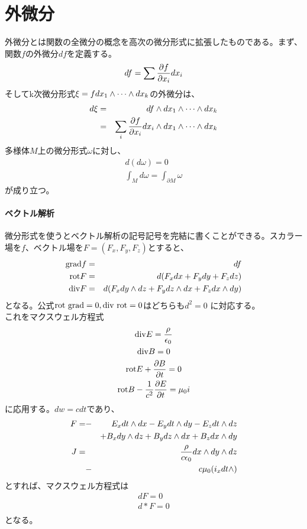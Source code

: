 \documentclass{jsarticle}
\begin{document}
    \section{外微分}
        外微分とは関数の全微分の概念を高次の微分形式に拡張したものである。まず、
        関数$f$の外微分$df$を定義する。
            \[df = \sum \pd[f]{x_i}dx_i\]
        そしてk次微分形式$\xi = fdx_1\we\cdots\we dx_k$の外微分は、
        \begin{eqnarray*}
            d\xi &=& df\we dx_1\we\cdots\we dx_k\\
            &=& \sum_i \pd[f]{x_i}dx_i\we dx_1\we\cdots\we dx_k\\
        \end{eqnarray*}
        多様体$M$上の微分形式$\omega$に対し、
        \begin{align*}
            d(d\omega) = 0\\
            \int_M d\omega = \int_{\partial M} \omega \tag{ストークスの定理}
        \end{align*}
        が成り立つ。
        \paragraph{ベクトル解析}
            微分形式を使うとベクトル解析の記号記号を完結に書くことができる。スカラー
            場を$f$、ベクトル場を$F = (F_x,F_y,F_z)$とすると、
            \begin{eqnarray*}
                {\rm grad}f &=& df\\
                {\rm rot}F &=& d(F_xdx+F_ydy+F_zdz)\\
                {\rm div}F &=& d(F_xdy\we dz+F_ydz\we dx+F_zdx\we dy)
            \end{eqnarray*}
            となる。公式${\rm rot\ grad}=0,{\rm div\ rot}=0$はどちらも$d^2=0$
            に対応する。\\
            これをマクスウェル方程式
            \begin{gather*}
                {\rm div}E = \frac{\rho}{\epsilon_0}\\
                {\rm div}B = 0\\
                {\rm rot}E+\pd[B]{t} = 0\\
                {\rm rot}B-\rec{c^2}\pd[E]{t} = \mu_0 i
            \end{gather*}
            に応用する。$dw = cdt$であり、
            \begin{eqnarray*}
                F = &-&E_xdt\we dx-E_ydt\we dy-E_zdt\we dz\\
                    & &+B_xdy\we dz+B_ydz\we dx+B_zdx\we dy\\
                J = & &\frac{\rho}{c\epsilon_0}dx\we dy\we dz\\
                    &-&c\mu_0(i_xdt\we)
            \end{eqnarray*}
            とすれば、マクスウェル方程式は
            \begin{eqnarray*}
                dF = 0\\
                d*F = 0\\
            \end{eqnarray*}
            となる。
\end{document}

